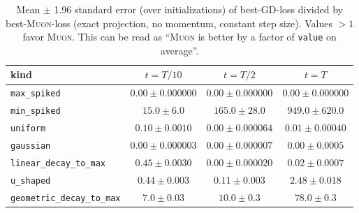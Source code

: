\documentclass{article}
\theoremstyle{plain}
\theoremstyle{definition}
\theoremstyle{remark}
\newcommand{\GD}{\textsc{GD}}
\newcommand{\Muon}{\textsc{Muon}}
\begin{document}
\begin{table}[H]
\centering
\small
\setlength{\tabcolsep}{3pt}
\renewcommand{\arraystretch}{1.15}
\caption{ Mean $\pm$ 1.96 standard error (over initializations) of best-\GD{}-loss divided by best-\Muon{}-loss (exact projection, no momentum, constant step size). 
Values $>1$ favor \Muon{}. 
This can be read as ``\Muon{} is better by a factor of \texttt{value} on average''.}
\label{tab:exact-muon-vs-gd-ratios}
\begin{tabular}{lccc}
\toprule
kind & $t=T/10$ & $t=T/2$ & $t=T$ \\
\midrule
\texttt{max\_spiked} & $0.00 \pm 0.000000$ & $0.00 \pm 0.000000$ & $0.00 \pm 0.000000$ \\
\texttt{min\_spiked} & $15.0 \pm 6.0$ & $165.0 \pm 28.0$ & $949.0 \pm 620.0$ \\
\texttt{uniform} & $0.10 \pm 0.0010$ & $0.00 \pm 0.000064$ & $0.01 \pm 0.00040$ \\
\texttt{gaussian} & $0.00 \pm 0.000003$ & $0.00 \pm 0.000007$ & $0.00 \pm 0.0005$ \\
\texttt{linear\_decay\_to\_max} & $0.45 \pm 0.0030$ & $0.00 \pm 0.000020$ & $0.02 \pm 0.0007$ \\
\texttt{u\_shaped} & $0.44 \pm 0.003$ & $0.11 \pm 0.003$ & $2.48 \pm 0.018$ \\
\texttt{geometric\_decay\_to\_max} & $7.0 \pm 0.03$ & $10.0 \pm 0.3$ & $78.0 \pm 0.3$ \\
\bottomrule
\end{tabular}
\end{table}
\end{document}
